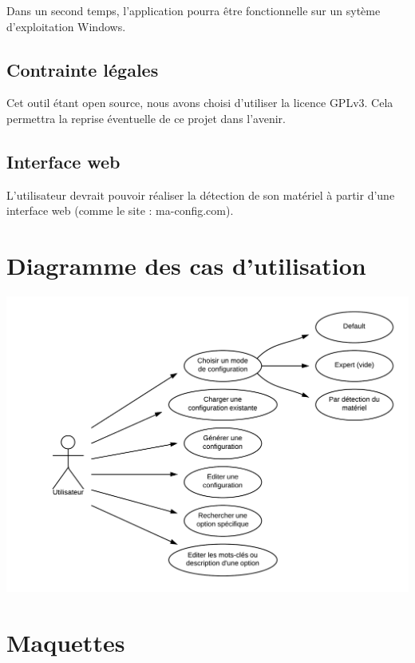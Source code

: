 \documentclass[16pts]{report}
\begin{document}
Dans un second temps, l'application pourra être fonctionnelle sur un sytème
d'exploitation Windows.


\section{Contrainte légales}
\label{sec:Contrainte légales}

Cet outil étant open source, nous avons choisi d'utiliser la licence GPLv3.
Cela permettra la reprise éventuelle de ce projet dans l'avenir.


\section{Interface web}
\label{sec:Interface web}

L’utilisateur devrait pouvoir réaliser la détection de son matériel à partir
d’une interface web (comme le site : ma-config.com).

\chapter{Diagramme des cas d'utilisation}
\label{cha:Diagramme des cas d'utilisation}
\includegraphics[scale=0.25]{illustrations/diagramme_cas_utilisation.png}


\chapter{Maquettes}
\label{cha:Maquettes}
\end{document}
